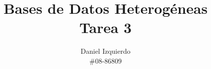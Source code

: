 \documentclass[10pt]{article}
\begin{document}

\title{Bases de Datos Heterogéneas \\ Tarea 3}
\author{Daniel Izquierdo \\ \#08-86809}

\maketitle

\section{}

\section{}
\end{document}
